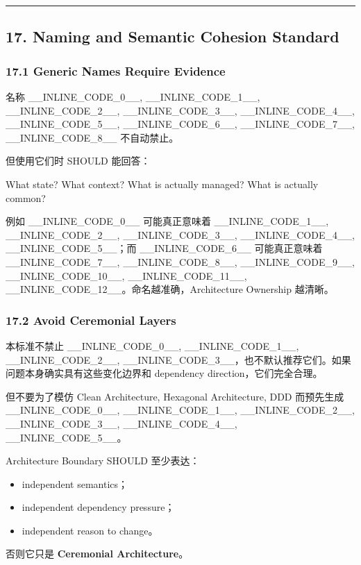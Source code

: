 \documentclass[11pt,a4paper]{article}
\begin{document}
\vspace{0.5em}\hrule\vspace{0.5em}
\subsection{17. Naming and Semantic Cohesion Standard}
\subsubsection{17.1 Generic Names Require Evidence}
名称 \_\_INLINE\_CODE\_0\_\_, \_\_INLINE\_CODE\_1\_\_, \_\_INLINE\_CODE\_2\_\_, \_\_INLINE\_CODE\_3\_\_, \_\_INLINE\_CODE\_4\_\_, \_\_INLINE\_CODE\_5\_\_, \_\_INLINE\_CODE\_6\_\_, \_\_INLINE\_CODE\_7\_\_, \_\_INLINE\_CODE\_8\_\_ 不自动禁止。

但使用它们时 SHOULD 能回答：

\begin{gfmBlockquote}
What state? What context? What is actually managed? What is actually common?
\end{gfmBlockquote}
例如 \_\_INLINE\_CODE\_0\_\_ 可能真正意味着 \_\_INLINE\_CODE\_1\_\_, \_\_INLINE\_CODE\_2\_\_, \_\_INLINE\_CODE\_3\_\_, \_\_INLINE\_CODE\_4\_\_, \_\_INLINE\_CODE\_5\_\_；而 \_\_INLINE\_CODE\_6\_\_ 可能真正意味着 \_\_INLINE\_CODE\_7\_\_, \_\_INLINE\_CODE\_8\_\_, \_\_INLINE\_CODE\_9\_\_, \_\_INLINE\_CODE\_10\_\_, \_\_INLINE\_CODE\_11\_\_, \_\_INLINE\_CODE\_12\_\_。命名越准确，Architecture Ownership 越清晰。

\subsubsection{17.2 Avoid Ceremonial Layers}
本标准不禁止 \_\_INLINE\_CODE\_0\_\_, \_\_INLINE\_CODE\_1\_\_, \_\_INLINE\_CODE\_2\_\_, \_\_INLINE\_CODE\_3\_\_，也不默认推荐它们。如果问题本身确实具有这些变化边界和 dependency direction，它们完全合理。

但不要为了模仿 Clean Architecture, Hexagonal Architecture, DDD 而预先生成 \_\_INLINE\_CODE\_0\_\_, \_\_INLINE\_CODE\_1\_\_, \_\_INLINE\_CODE\_2\_\_, \_\_INLINE\_CODE\_3\_\_, \_\_INLINE\_CODE\_4\_\_, \_\_INLINE\_CODE\_5\_\_。

Architecture Boundary SHOULD 至少表达：

\begin{itemize}
  \item independent semantics；
  \item independent dependency pressure；
  \item independent reason to change。
\end{itemize}
否则它只是 \textbf{Ceremonial Architecture}。
\end{document}
